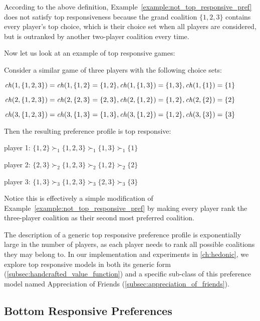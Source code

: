 According to the above definition, Example~\ref{example:not_top_responsive_pref}
does not satisfy top responsiveness because the grand coalition $\{1, 2, 3\}$
contains every player's top choice, which is their choice set when all players
are considered, but is outranked by another two-player coalition every time.

Now let us look at an example of top responsive games:

\begin{example}
\label{example:top_responsive_pref}
  Consider a similar game of three players with the following choice sets:

  $\mathit{ch}(1, \{1, 2, 3\}) = \mathit{ch}(1, \{1, 2\} = \{1, 2\},
   \mathit{ch}(1, \{1, 3\}) = \{1, 3\}, \mathit{ch}(1, \{1\}) = \{1\}$

  $\mathit{ch}(2, \{1, 2, 3\}) = \mathit{ch}(2, \{2, 3\} = \{2, 3\},
   \mathit{ch}(2, \{1, 2\}) = \{1, 2\}, \mathit{ch}(2, \{2\}) = \{2\}$

  $\mathit{ch}(3, \{1, 2, 3\}) = \mathit{ch}(3, \{1, 3\} = \{1, 3\},
   \mathit{ch}(3, \{1, 2\}) = \{1, 2\}, \mathit{ch}(3, \{3\}) = \{3\}$

  Then the resulting preference profile is top responsive:

  player 1: $\{1, 2\} \succ_1 \{1, 2, 3\} \succ_1 \{1, 3\} \succ_1  \{1\}$

  player 2: $\{2, 3\} \succ_2 \{1, 2, 3\} \succ_2 \{1, 2\} \succ_2  \{2\}$

  player 3: $\{1, 3\} \succ_3 \{1, 2, 3\} \succ_3 \{2, 3\} \succ_3  \{3\}$

  Notice this is effectively a simple modification of
  Example~\ref{example:not_top_responsive_pref} by making every player rank
  the three-player coalition as their second most preferred coalition.
\end{example}

The description of a generic top responsive preference profile is exponentially
large in the number of players, as each player needs to rank all possible
coalitions they may belong to.
In our implementation and experiments in \autoref{ch:hedonic}, we explore
top responsive models in both its generic form
(\autoref{subsec:handcrafted_value_function}) and a specific sub-class of
this preference model named Appreciation of Friends
(\autoref{subsec:appreciation_of_friends}).

\subsection{Bottom Responsive Preferences}
\label{subsec:bottom_responsive_preferences}

